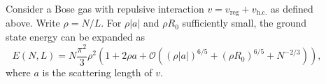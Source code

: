 \documentclass[final]{beamer}
\newlength{\sepwidth}
\newlength{\colwidth}
\newcommand{\separatorcolumn}{\begin{column}{\sepwidth}\end{column}}
\begin{document}
\begin{frame}[t]
\begin{columns}[t]
\begin{column}{\colwidth}
\begin{tcolorbox}[colframe=kugreen,colback=kugreenlyslyslys,title=The scattering length]
		\end{tcolorbox}
			
		\begin{tcolorbox}[colframe=kugreen,colback=kugreenlyslyslys,title=Main result]
			\begin{theorem}
				\label{TheoremMain}
				Consider a Bose gas with repulsive interaction  $v=v_{\text{reg}}+v_{\text{h.c.}}$ as defined above. Write $\rho=N/L$. For $\rho|a|$ and $\rho R_0$ sufficiently small, the ground state energy can be expanded as 
				\begin{equation}
				\label{result}
				E(N,L)=N\frac{\pi^2}{3}\rho^2\left(1+2\rho a+
				\mathcal{O}
				\left((\rho|a|)^{6/5}+(\rho R_0)^{6/5}+N^{-2/3}\right)\right),
				\end{equation}
				where $a$ is the scattering length of $v$.
			\end{theorem}
		\end{tcolorbox}	
			
		\end{column}
		
		\separatorcolumn
		
		
		\separatorcolumn
	\end{columns}
	\end{frame}
\end{document}

